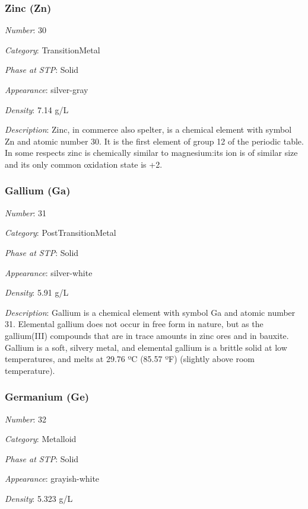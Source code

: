 \documentclass{article}
\begin{document}
\hypertarget{subsubsection::Zn}{}\subsubsection{Zinc (Zn)}

\textit{Number}: 30

\textit{Category}: TransitionMetal

\textit{Phase at STP}: Solid

\textit{Appearance}: silver-gray

\textit{Density}: 7.14 g/L

\textit{Description}: Zinc, in commerce also spelter, is a chemical element with symbol Zn and atomic number 30. It is the first element of group 12 of the periodic table. In some respects zinc is chemically similar to magnesium:its ion is of similar size and its only common oxidation state is +2.

\hypertarget{subsubsection::Ga}{}\subsubsection{Gallium (Ga)}

\textit{Number}: 31

\textit{Category}: PostTransitionMetal

\textit{Phase at STP}: Solid

\textit{Appearance}: silver-white

\textit{Density}: 5.91 g/L

\textit{Description}: Gallium is a chemical element with symbol Ga and atomic number 31. Elemental gallium does not occur in free form in nature, but as the gallium(III) compounds that are in trace amounts in zinc ores and in bauxite. Gallium is a soft, silvery metal, and elemental gallium is a brittle solid at low temperatures, and melts at 29.76 ºC (85.57 ºF) (slightly above room temperature).

\hypertarget{subsubsection::Ge}{}\subsubsection{Germanium (Ge)}

\textit{Number}: 32

\textit{Category}: Metalloid

\textit{Phase at STP}: Solid

\textit{Appearance}: grayish-white

\textit{Density}: 5.323 g/L
\end{document}
